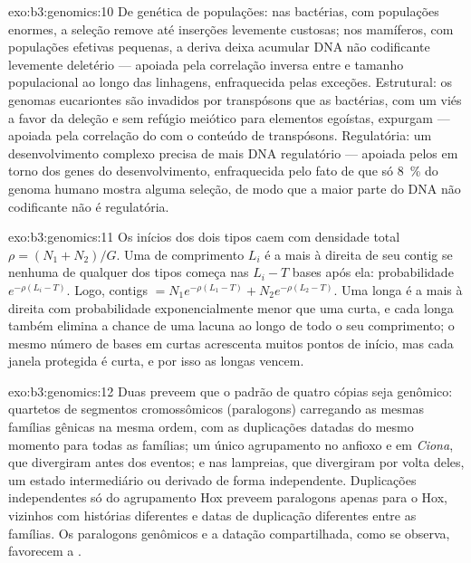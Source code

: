 \begin{solution}{exo:b3:genomics:10}
De genética de populações: nas bactérias, com populações enormes, a
seleção remove até inserções levemente custosas; nos mamíferos, com
populações efetivas pequenas, a deriva deixa acumular DNA não
codificante levemente deletério --- apoiada pela correlação inversa
entre  e tamanho populacional ao longo das linhagens,
enfraquecida pelas exceções. Estrutural: os genomas eucariontes são
invadidos por transpósons que as bactérias, com um viés a favor da
deleção e sem refúgio meiótico para elementos egoístas, expurgam ---
apoiada pela correlação do  com o conteúdo de
transpósons. Regulatória: um desenvolvimento complexo precisa de mais
DNA regulatório --- apoiada pelos  em torno dos genes do desenvolvimento, enfraquecida pelo
fato de que só \qty{8}{\%} do genoma humano mostra alguma seleção, de
modo que a maior parte do DNA não codificante não é regulatória.
\end{solution}

\begin{solution}{exo:b3:genomics:11}
Os inícios dos dois tipos caem com densidade total $\rho = (N_{1} +
N_{2})/G$. Uma  de comprimento $L_{i}$ é a mais à direita de seu
contig se nenhuma  de qualquer dos tipos começa nas $L_{i} - T$
bases após ela: probabilidade $e^{-\rho(L_{i} - T)}$. Logo, contigs
$= N_{1}
e^{-\rho(L_{1} - T)} + N_{2} e^{-\rho(L_{2} - T)}$. Uma
 longa é a mais à direita com probabilidade exponencialmente
menor que uma curta, e cada  longa também elimina a chance de
uma lacuna ao longo de todo o seu comprimento; o mesmo número de bases
em  curtas acrescenta muitos pontos de início, mas cada janela
protegida é curta, e por isso as  longas vencem.
\end{solution}

\begin{solution}{exo:b3:genomics:12}
Duas  preveem que o padrão de quatro
cópias seja genômico: quartetos de segmentos cromossômicos 
(paralogons) carregando as mesmas famílias gênicas na mesma ordem, com
as duplicações datadas do mesmo momento para todas as famílias; um
único agrupamento no anfioxo e em \emph{Ciona}, que divergiram antes
dos eventos; e nas lampreias, que divergiram por volta deles, um
estado intermediário ou derivado de forma independente. Duplicações
independentes só do agrupamento Hox preveem paralogons apenas para o
Hox, vizinhos com histórias diferentes e datas de duplicação
diferentes entre as famílias. Os paralogons genômicos e a datação
compartilhada, como se observa, favorecem a .
\end{solution}

